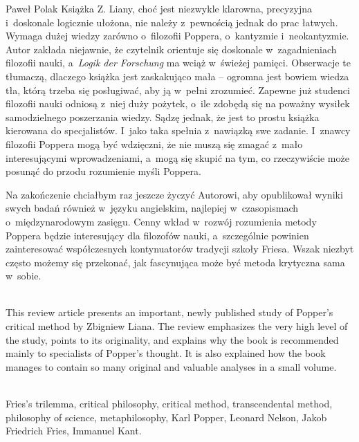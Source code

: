 \begin{newrevplenv}{Paweł Polak}
Książka Z. Liany, choć jest niezwykle klarowna, precyzyjna i~doskonale logicznie ułożona, nie należy z~pewnością jednak do prac łatwych. Wymaga dużej wiedzy zarówno o~filozofii Poppera, o~kantyzmie i~neokantyzmie. Autor zakłada niejawnie, że czytelnik orientuje się doskonale w~zagadnieniach filozofii nauki, a~\textit{Logik der Forschung} ma wciąż w~świeżej pamięci. Obserwacje te tłumaczą, dlaczego książka jest zaskakująco mała -- ogromna jest bowiem wiedza tła, którą trzeba się posługiwać, aby ją w~pełni zrozumieć. Zapewne już studenci filozofii nauki odniosą z~niej duży pożytek, o~ile zdobędą się na poważny wysiłek samodzielnego poszerzania wiedzy. Sądzę jednak, że jest to prostu książka kierowana do specjalistów. I~jako taka spełnia z~nawiązką swe zadanie. I~znawcy filozofii Poppera mogą być wdzięczni, że nie muszą się zmagać z~mało interesującymi wprowadzeniami, a~mogą się skupić na tym, co rzeczywiście może posunąć do przodu rozumienie myśli Poppera.

Na zakończenie chciałbym raz jeszcze życzyć Autorowi, aby opublikował wyniki swych badań również w~języku angielskim, najlepiej w~czasopismach o~międzynarodowym zasięgu. Cenny wkład w~rozwój rozumienia metody Poppera będzie interesujący dla filozofów nauki, a~szczególnie powinien zainteresować współczesnych kontynuatorów tradycji szkoły Friesa. Wszak niezbyt często możemy się przekonać, jak fascynująca może być metoda krytyczna sama w~sobie.






\vspace{5mm}%
\begin{flushright}
{\chaptitleeng\color{black!50}{Why is Popper's critical method fascinating?}}
\end{flushright}

{}\\
{This review article presents an important, newly published study of Popper's critical method by Zbigniew Liana. The review emphasizes the very high level of the study, points to its originality, and explains why the book is recommended mainly to specialists of Popper's thought. It is also explained how the book manages to contain so many original and valuable analyses in a small volume.
}\par%
\vspace{2mm}%
{}\\%
{Fries's trilemma, critical philosophy, critical method, transcendental method, philosophy of science, metaphilosophy, Karl Popper, Leonard Nelson, Jakob Friedrich Fries, Immanuel Kant.}%


\end{newrevplenv}